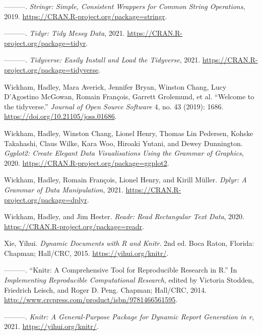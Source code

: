 \documentclass[
  12pt,
]{article}
\newlength{\cslhangindent}
\newenvironment{CSLReferences}[2] %
 {%
  \setlength{\parindent}{0pt}
  \ifodd #1 \everypar{\setlength{\hangindent}{\cslhangindent}}\ignorespaces\fi
  \ifnum #2 > 0
  \setlength{\parskip}{#2\baselineskip}
  \fi
 }%
 {}
\begin{document}
\begin{CSLReferences}{1}{0}
\leavevmode{}%
---------. \emph{Stringr: Simple, Consistent Wrappers for Common String
Operations}, 2019. \url{https://CRAN.R-project.org/package=stringr}.

\leavevmode{}%
---------. \emph{Tidyr: Tidy Messy Data}, 2021.
\url{https://CRAN.R-project.org/package=tidyr}.

\leavevmode{}%
---------. \emph{Tidyverse: Easily Install and Load the Tidyverse},
2021. \url{https://CRAN.R-project.org/package=tidyverse}.

\leavevmode{}%
Wickham, Hadley, Mara Averick, Jennifer Bryan, Winston Chang, Lucy
D'Agostino McGowan, Romain François, Garrett Grolemund, et al.
{``Welcome to the {tidyverse}.''} \emph{Journal of Open Source Software}
4, no. 43 (2019): 1686. \url{https://doi.org/10.21105/joss.01686}.

\leavevmode{}%
Wickham, Hadley, Winston Chang, Lionel Henry, Thomas Lin Pedersen,
Kohske Takahashi, Claus Wilke, Kara Woo, Hiroaki Yutani, and Dewey
Dunnington. \emph{Ggplot2: Create Elegant Data Visualisations Using the
Grammar of Graphics}, 2020.
\url{https://CRAN.R-project.org/package=ggplot2}.

\leavevmode{}%
Wickham, Hadley, Romain François, Lionel Henry, and Kirill Müller.
\emph{Dplyr: A Grammar of Data Manipulation}, 2021.
\url{https://CRAN.R-project.org/package=dplyr}.

\leavevmode{}%
Wickham, Hadley, and Jim Hester. \emph{Readr: Read Rectangular Text
Data}, 2020. \url{https://CRAN.R-project.org/package=readr}.

\leavevmode{}%
Xie, Yihui. \emph{Dynamic Documents with {R} and Knitr}. 2nd ed. Boca
Raton, Florida: Chapman; Hall/CRC, 2015. \url{https://yihui.org/knitr/}.

\leavevmode{}%
---------. {``Knitr: A Comprehensive Tool for Reproducible Research in
{R}.''} In \emph{Implementing Reproducible Computational Research},
edited by Victoria Stodden, Friedrich Leisch, and Roger D. Peng.
Chapman; Hall/CRC, 2014.
\url{http://www.crcpress.com/product/isbn/9781466561595}.

\leavevmode{}%
---------. \emph{Knitr: A General-Purpose Package for Dynamic Report
Generation in r}, 2021. \url{https://yihui.org/knitr/}.

\end{CSLReferences}
\end{document}
